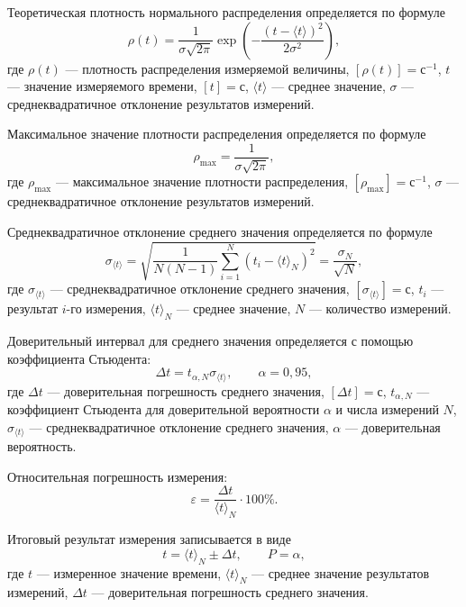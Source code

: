 \documentclass[a4paper,12pt]{article}
\begin{document}
Теоретическая плотность нормального распределения определяется по формуле
\begin{equation}
\rho(t) =
\frac{1}{\sigma\sqrt{2\pi}}
\exp\left(
-\frac{
\left(t-\langle t\rangle\right)^2
}{
2\sigma^2
}
\right),
\end{equation}
где $\rho(t)$ --- плотность распределения измеряемой величины, $[\rho(t)] = \text{с}^{-1}$, $t$ --- значение измеряемого времени, $[t] = \text{с}$, $\langle t\rangle$ --- среднее значение, $\sigma$ --- среднеквадратичное отклонение результатов измерений.

Максимальное значение плотности распределения определяется по формуле
\begin{equation}
\rho_{\max} =
\frac{1}{\sigma\sqrt{2\pi}},
\end{equation}
где $\rho_{\max}$ --- максимальное значение плотности распределения, $[\rho_{\max}] = \text{с}^{-1}$, $\sigma$ --- среднеквадратичное отклонение результатов измерений.

Среднеквадратичное отклонение среднего значения определяется по формуле
\begin{equation}
\sigma_{\langle t\rangle} =
\sqrt{
\frac{1}{N(N-1)}
\sum_{i=1}^{N}
\left(t_i-\langle t\rangle_N\right)^2
} = \frac{\sigma_N}{\sqrt{N}},
\end{equation}
где $\sigma_{\langle t\rangle}$ --- среднеквадратичное отклонение среднего значения, $[\sigma_{\langle t\rangle}] = \text{с}$, $t_i$ --- результат $i$-го измерения, $\langle t\rangle_N$ --- среднее значение, $N$ --- количество измерений.

Доверительный интервал для среднего значения определяется с помощью коэффициента Стьюдента:
\begin{equation}
\Delta t =
t_{\alpha,N}\sigma_{\langle t\rangle},
\qquad \alpha=0{,}95,
\end{equation}
где $\Delta t$ --- доверительная погрешность среднего значения, $[\Delta t] = \text{с}$, $t_{\alpha,N}$ --- коэффициент Стьюдента для доверительной вероятности $\alpha$ и числа измерений $N$, $\sigma_{\langle t\rangle}$ --- среднеквадратичное отклонение среднего значения, $\alpha$ --- доверительная вероятность.

Относительная погрешность измерения:
\begin{equation}
\varepsilon = \frac{\Delta t}{\langle t\rangle_N} \cdot 100\%.
\end{equation}

Итоговый результат измерения записывается в виде
\begin{equation}
t = \langle t\rangle_N \pm \Delta t, \qquad P = \alpha,
\end{equation}
где $t$ --- измеренное значение времени, $\langle t\rangle_N$ --- среднее значение результатов измерений, $\Delta t$ --- доверительная погрешность среднего значения.
\end{document}
